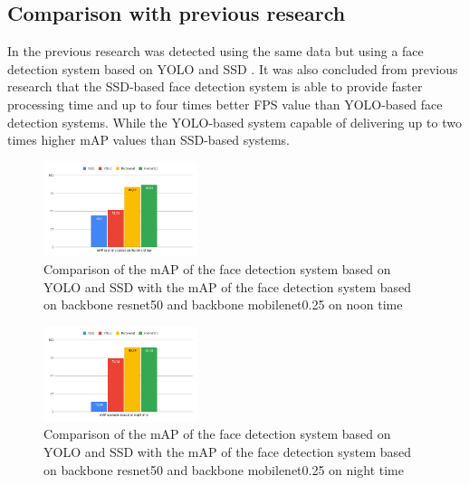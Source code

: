 \subsection{Comparison with previous research}

In the previous research was detected using the same data but using a face detection system based on YOLO and SSD \citep{nugrohoevalution2016}.
It was also concluded from previous research that the SSD-based face detection system is able to provide
faster processing time and up to four times better FPS value than YOLO-based face detection systems. While the YOLO-based system
capable of delivering up to two times higher mAP values than SSD-based systems.

\begin{figure} [ht]
  \centering
  \includegraphics[width=0.4\textwidth]{gambar/perbandinganmapsiang.png}

  \caption{Comparison of the mAP of the face detection system based on YOLO and SSD with the mAP of the face detection system based on backbone resnet50 and backbone mobilenet0.25 on noon time}
  \label{fig:perbandinganmapsiang}
\end{figure}

\begin{figure} [ht]
  \centering
  \includegraphics[width=0.4\textwidth]{gambar/perbandinganmapmalam.png}

  \caption{Comparison of the mAP of the face detection system based on YOLO and SSD with the mAP of the face detection system based on backbone resnet50 and backbone mobilenet0.25 on night time}
  \label{fig:perbandinganmapmalam}
\end{figure}


